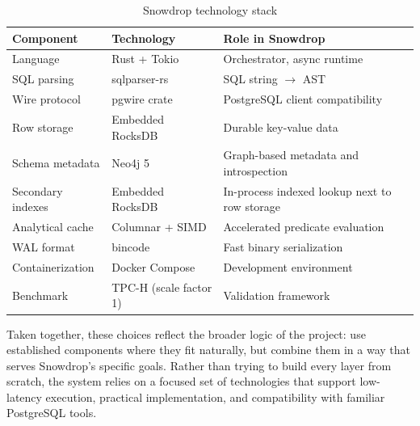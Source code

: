 \begin{table}[H]
\centering
\caption{Snowdrop technology stack}
\label{tab:tech-stack}
\renewcommand{\arraystretch}{1.4}
\small
\begin{tabular}{|l|l|l|}
\hline
\textbf{Component} & \textbf{Technology} & \textbf{Role in Snowdrop} \\
\hline
Language & Rust + Tokio & Orchestrator, async runtime \\
\hline
SQL parsing & sqlparser-rs & SQL string $\rightarrow$ AST \\
\hline
Wire protocol & pgwire crate & PostgreSQL client compatibility \\
\hline
Row storage & Embedded RocksDB & Durable key-value data \\
\hline
Schema metadata & Neo4j 5 & Graph-based metadata and introspection \\
\hline
Secondary indexes & Embedded RocksDB & In-process indexed lookup next to row storage \\
\hline
Analytical cache & Columnar + SIMD & Accelerated predicate evaluation \\
\hline
WAL format & bincode & Fast binary serialization \\
\hline
Containerization & Docker Compose & Development environment \\
\hline
Benchmark & TPC-H (scale factor 1) & Validation framework \\
\hline
\end{tabular}
\end{table}

Taken together, these choices reflect the broader logic of the project: use established components where they fit naturally, but combine them in a way that serves Snowdrop’s specific goals. Rather than trying to build every layer from scratch, the system relies on a focused set of technologies that support low-latency execution, practical implementation, and compatibility with familiar PostgreSQL tools.
